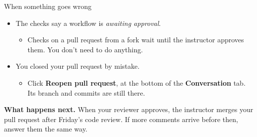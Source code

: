 \documentclass{handout}
\begin{document}
\begin{frame}{When something goes wrong}
\begin{itemize}[itemsep=5pt,topsep=4pt]
\begin{itemize}[label=$\rightarrow$,topsep=1pt]
      \end{itemize}
    \item The checks say a workflow is \textit{awaiting approval}.
      \begin{itemize}[label=$\rightarrow$,topsep=1pt]
        \item Checks on a pull request from a fork wait until the
          instructor approves them. You don't need to do anything.
      \end{itemize}
    \item You closed your pull request by mistake.
      \begin{itemize}[label=$\rightarrow$,topsep=1pt]
        \item Click \textbf{Reopen pull request}, at the bottom of the
          \textbf{Conversation} tab. Its branch and commits are still
          there.
      \end{itemize}
  \end{itemize}

  \medskip
  \textbf{What happens next.} When your reviewer approves, the instructor
  merges your pull request after Friday's code review. If more comments
  arrive before then, answer them the same way.
\end{frame}
\end{document}
